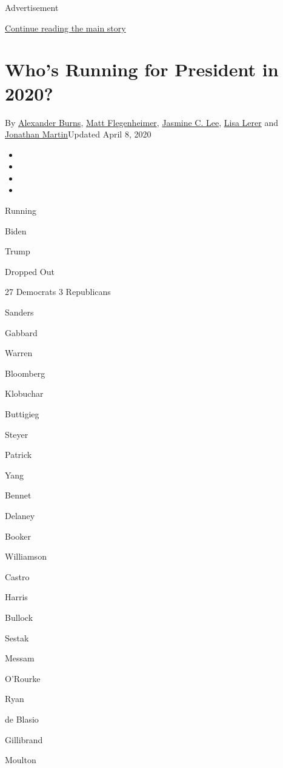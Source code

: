 Advertisement

\protect\hyperlink{after-top}{Continue reading the main story}

\hypertarget{whos-running-for-president-in-2020}{%
\section{Who's Running for President in
2020?}\label{whos-running-for-president-in-2020}}

By \href{https://www.nytimes.com/by/alexander-burns}{Alexander Burns},
\href{https://www.nytimes.com/by/matt-flegenheimer}{Matt Flegenheimer},
\href{https://www.nytimes.com/by/jasmine-c-lee}{Jasmine C. Lee},
\href{https://www.nytimes.com/by/lisa-lerer}{Lisa Lerer} and
\href{https://www.nytimes.com/by/jonathan-martin}{Jonathan
Martin}Updated April 8, 2020

\begin{itemize}
\item
\item
\item
\item
\end{itemize}

Running

Biden

Trump

Dropped Out

27 Democrats 3 Republicans

Sanders

Gabbard

Warren

Bloomberg

Klobuchar

Buttigieg

Steyer

Patrick

Yang

Bennet

Delaney

Booker

Williamson

Castro

Harris

Bullock

Sestak

Messam

O'Rourke

Ryan

de Blasio

Gillibrand

Moulton

